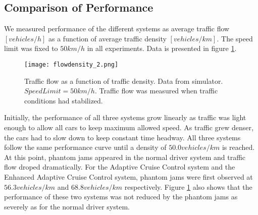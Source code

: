 \subsection{Comparison of Performance}
We measured performance of the different systems as average traffic flow
$ [\unit{vehicles/h}] $ as a function of average traffic density
$ [\unit{vehicles/km}] $. The speed limit was fixed to $ 50 \unit{km/h} $ in all
experiments. Data is presented in figure \ref{performance}.
\begin{figure}[h!]
    \begin{center}
    \texttt{[image: flowdensity\_2.png]}
    \caption{\label{performance}
Traffic flow as a function of traffic density. Data from simulator.
$SpeedLimit=50 \unit{km/h}$. Traffic flow was measured when traffic conditions had stabilized.}
    \end{center}
\end{figure}
Initially, the performance of all three systems grow linearly as traffic
was light enough to allow all cars to keep maximum allowed speed. As traffic
grew denser, the cars had to slow down to keep constant time headway. All
three systems follow the same performance curve until a density of $ 50.0
\unit{vehicles/km} $ is reached. At this point, phantom jams appeared in the
normal driver system and traffic flow droped dramatically. For the Adaptive
Cruise Control system and the Enhanced Adaptive Cruise Control system,
phantom jams were first observed at $ 56.3 \unit{vehicles/km} $ and $ 68.8
\unit{vehicles/km} $ respectively. Figure \ref{performance} also shows that
the performance of these two systems was not reduced by the phantom jams as
severely as for the normal driver system.



